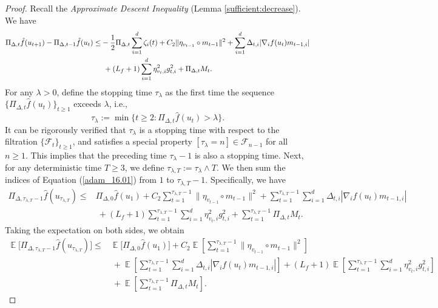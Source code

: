 \documentclass{article} %
\DeclareMathOperator{\Expect}{\mathbb{E}}
\begin{document}
\begin{proof}
Recall the \emph{Approximate Descent Inequality} (Lemma \ref{sufficient:decrease}). We have
\begin{align}\label{adam_16.01}
\Pi_{\Delta,t}\hat{f}(u_{t+1})-\Pi_{\Delta,t-1}\hat{f}(u_{t})\le& -\frac{1}{2}\Pi_{\Delta,t}\sum_{i=1}^{d}\zeta_{i}(t)\notag+C_{2}\|{\eta_{v_{t-1}}}\circ m_{t-1}\|^{2}+\sum_{i=1}^{d}\Delta_{t,i}|\nabla_{i} f(u_{t})m_{t-1,i}|\\&\ +(L_{f}+1)\sum_{i=1}^{d}\eta_{v_{t},i}^{2}g_{t,i}^{2}+\Pi_{\Delta,t}M_{t}.
\end{align}
For any $\lambda > 0$, define the stopping time $\tau_{\lambda}$ as the first time the sequence $\{\Pi_{\Delta,t} \hat{f}(u_{t})\}_{t \geq 1}$ exceeds $\lambda$, i.e.,
\[\tau_{\lambda} := \min\{t \geq 2 : \Pi_{\Delta,t} \hat{f}(u_{t}) > \lambda\}.\]
It can be rigorously verified that $\tau_{\lambda}$ is a stopping time with respect to the filtration $\{\mathscr{F}_{t}\}_{t \geq 1}$, and satisfies a special property $[\tau_{\lambda} = n] \in \mathscr{F}_{n-1}$ for all $n \geq 1$. This implies that the preceding time $\tau_{\lambda} - 1$ is also a stopping time.
Next, for any deterministic time $T \geq 3$, we define $\tau_{\lambda,T} := \tau_{\lambda} \wedge T$. We then sum the indices of Equation (\ref{adam_16.01}) from $1$ to $\tau_{\lambda,T} - 1$. Specifically, we have
\begin{align*}
\Pi_{\Delta,\tau_{\lambda,T}-1}\hat{f}(u_{\tau_{\lambda,T}})\le& \Pi_{\Delta,0}\hat{f}(u_{1})+C_{2}\sum_{t=1}^{\tau_{\lambda,T}-1}\|{\eta_{v_{t-1}}}\circ m_{t-1}\|^{2}+\sum_{t=1}^{\tau_{\lambda,T}-1}\sum_{i=1}^{d}\Delta_{t,i}|\nabla_{i} f(u_{t})m_{t-1,i}|\\&\ +(L_{f}+1)\sum_{t=1}^{\tau_{\lambda,T}-1}\sum_{i=1}^{d}\eta_{v_{t},i}^{2}g_{t,i}^{2}+\sum_{t=1}^{\tau_{\lambda,T}-1}\Pi_{\Delta,t}M_{t}.
\end{align*}
Taking the expectation on both sides, we obtain
\begin{align*}
\Expect\Big[\Pi_{\Delta,\tau_{\lambda,T}-1}\hat{f}(u_{\tau_{\lambda,T}})\Big]\le & \Expect\Big[\Pi_{\Delta,0}\hat{f}(u_{1})\Big]+C_{2}\Expect\left[\sum_{t=1}^{\tau_{\lambda,T}-1}\|{\eta_{v_{t-1}}}\circ m_{t-1}\|^{2}\right]\\&\ +\Expect\left[\sum_{t=1}^{\tau_{\lambda,T}-1}\sum_{i=1}^{d}\Delta_{t,i}|\nabla_{i} f(u_{t})m_{t-1,i}|\right]+(L_{f}+1)\Expect\left[\sum_{t=1}^{\tau_{\lambda,T}-1}\sum_{i=1}^{d}\eta_{v_{t},i}^{2}g_{t,i}^{2}\right]\\&\ +\Expect\left[\sum_{t=1}^{\tau_{\lambda,T}-1}\Pi_{\Delta,t}M_{t}\right].
\end{align*}

\end{proof}
\end{document}

